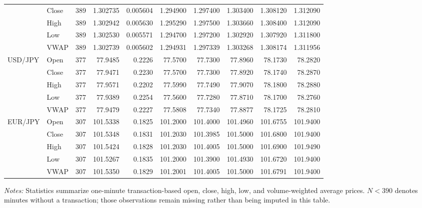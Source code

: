 \documentclass[11pt]{article}
\begin{document}
\begin{landscape}
\begin{table}[H]
\begin{threeparttable}
\begin{tabular}{@{}llrrrrrrrr@{}}
        & Close & 389 & 1.302735 & 0.005604 & 1.294900 & 1.297400 & 1.303400 & 1.308120 & 1.312090\\
        & High  & 389 & 1.302942 & 0.005630 & 1.295290 & 1.297500 & 1.303660 & 1.308400 & 1.312090\\
        & Low   & 389 & 1.302530 & 0.005571 & 1.294700 & 1.297200 & 1.302920 & 1.307920 & 1.311800\\
        & VWAP  & 389 & 1.302739 & 0.005602 & 1.294931 & 1.297339 & 1.303268 & 1.308174 & 1.311956\\
USD/JPY & Open  & 377 & 77.9485 & 0.2226 & 77.5700 & 77.7300 & 77.8960 & 78.1730 & 78.2820\\
        & Close & 377 & 77.9471 & 0.2230 & 77.5700 & 77.7300 & 77.8920 & 78.1740 & 78.2870\\
        & High  & 377 & 77.9571 & 0.2202 & 77.5990 & 77.7490 & 77.9070 & 78.1800 & 78.2880\\
        & Low   & 377 & 77.9389 & 0.2254 & 77.5600 & 77.7280 & 77.8710 & 78.1700 & 78.2760\\
        & VWAP  & 377 & 77.9479 & 0.2227 & 77.5808 & 77.7340 & 77.8877 & 78.1725 & 78.2810\\
EUR/JPY & Open  & 307 & 101.5338 & 0.1825 & 101.2000 & 101.4000 & 101.4960 & 101.6755 & 101.9400\\
        & Close & 307 & 101.5348 & 0.1831 & 101.2030 & 101.3985 & 101.5000 & 101.6800 & 101.9400\\
        & High  & 307 & 101.5424 & 0.1828 & 101.2030 & 101.4005 & 101.5000 & 101.6900 & 101.9490\\
        & Low   & 307 & 101.5267 & 0.1835 & 101.2000 & 101.3900 & 101.4930 & 101.6720 & 101.9400\\
        & VWAP  & 307 & 101.5350 & 0.1829 & 101.2001 & 101.4005 & 101.5000 & 101.6791 & 101.9400\\
\bottomrule
\end{tabular}
\begin{tablenotes}[flushleft]\footnotesize
\item \textit{Notes:} Statistics summarize one-minute transaction-based open, close, high, low, and volume-weighted average prices. $N<390$ denotes minutes without a transaction; those observations remain missing rather than being imputed in this table.
\end{tablenotes}
\end{threeparttable}
\end{table}
\end{landscape}
\end{document}
